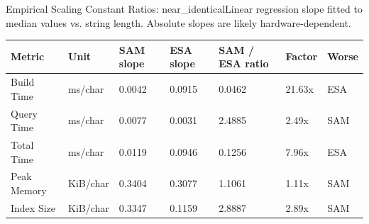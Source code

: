 \begin{benchmarktable}{Empirical Scaling Constant Ratios: near\_identical}{Linear regression slope fitted to median values vs. string length. Absolute slopes are likely hardware-dependent.}
\begin{tabularx}{\textwidth}{|X|X|X|X|X|X|X|}
\toprule
Metric & Unit & SAM slope & ESA slope & SAM / ESA ratio & Factor & Worse \\
\midrule
Build Time & ms/char & 0.0042 & 0.0915 & 0.0462 & 21.63x & ESA \\
Query Time & ms/char & 0.0077 & 0.0031 & 2.4885 & 2.49x & SAM \\
Total Time & ms/char & 0.0119 & 0.0946 & 0.1256 & 7.96x & ESA \\
Peak Memory & KiB/char & 0.3404 & 0.3077 & 1.1061 & 1.11x & SAM \\
Index Size & KiB/char & 0.3347 & 0.1159 & 2.8887 & 2.89x & SAM \\
\bottomrule
\end{tabularx}
\end{benchmarktable}